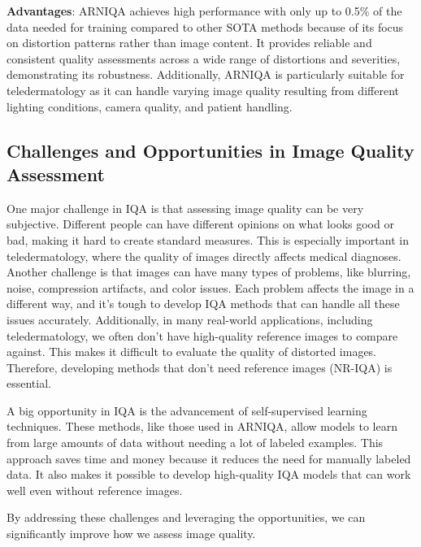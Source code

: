 \vspace{\baselineskip}
\noindent
\textbf{Advantages}: ARNIQA achieves high performance with only up to 0.5\% of the data needed for training compared to other SOTA methods because of its focus on distortion patterns rather than image content. It provides reliable and consistent quality assessments across a wide range of distortions and severities, demonstrating its robustness. Additionally, ARNIQA is particularly suitable for teledermatology as it can handle varying image quality resulting from different lighting conditions, camera quality, and patient handling. \par

\subsection{Challenges and Opportunities in Image Quality Assessment} 
\label{sub:ChallengesOpportunitiesIQA} 
One major challenge in IQA is that assessing image quality can be very subjective. Different people can have different opinions on what looks good or bad, making it hard to create standard measures. This is especially important in teledermatology, where the quality of images directly affects medical diagnoses. Another challenge is that images can have many types of problems, like blurring, noise, compression artifacts, and color issues. Each problem affects the image in a different way, and it’s tough to develop IQA methods that can handle all these issues accurately. Additionally, in many real-world applications, including teledermatology, we often don’t have high-quality reference images to compare against. This makes it difficult to evaluate the quality of distorted images. Therefore, developing methods that don’t need reference images (NR-IQA) is essential.\par
\vspace{\baselineskip}
\noindent
A big opportunity in IQA is the advancement of self-supervised learning techniques. These methods, like those used in ARNIQA, allow models to learn from large amounts of data without needing a lot of labeled examples. This approach saves time and money because it reduces the need for manually labeled data. It also makes it possible to develop high-quality IQA models that can work well even without reference images. \par
\vspace{\baselineskip}
\noindent
By addressing these challenges and leveraging the opportunities, we can significantly improve how we assess image quality. \par
\clearpage

